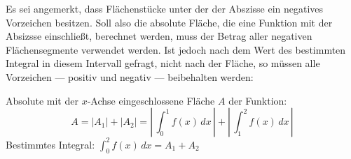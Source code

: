 Es sei angemerkt, dass Fl\"{a}chenst\"{u}cke unter der der Abszisse ein negatives Vorzeichen besitzen. Soll also die absolute Fl\"{a}che, die eine Funktion mit der Absizsse einschlie\ss{}t, berechnet werden, muss der Betrag aller negativen Fl\"{a}chensegmente verwendet werden. Ist jedoch nach dem Wert des bestimmten Integral in diesem Intervall gefragt, nicht nach der Fl\"{a}che, so m\"{u}ssen alle Vorzeichen --- positiv und negativ --- beibehalten werden:

\begin{figure}[h!]
	\centering
\end{figure}

Absolute mit der $x$-Achse eingeschlossene Fl\"{a}che $A$ der Funktion: $$A = |A_1| + |A_2| = \left|\,\int_{0}^{1}f(x)\,dx\,\right| + \left|\,\int_{1}^{2}f(x)\,dx\,\right|$$ Bestimmtes Integral: $\int_{0}^{2} f(x)\,dx = A_1 + A_2$

\pagebreak


